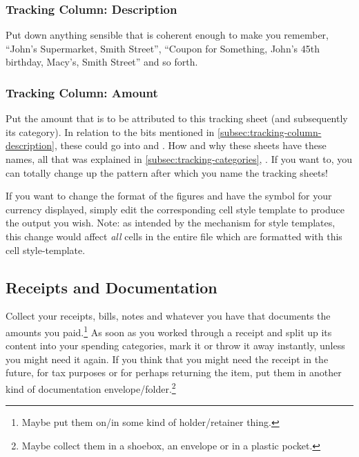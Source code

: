 \subsubsection{Tracking Column: Description}
\label{subsec:tracking-column-description}

Put down anything sensible that is coherent enough to make you remember, \eg ``John's Supermarket, Smith Street'', ``Coupon for Something, John's 45th birthday, Macy's, Smith Street'' and so forth.

\subsubsection{Tracking Column: Amount}
\label{subsec:tracking-column-amount}

Put the amount that is to be attributed to this tracking sheet (and subsequently its category).
In relation to the bits mentioned in \autoref{subsec:tracking-column-description}, these could go into  and .
How and why these sheets have these names, all that was explained in \autoref{subsec:tracking-categories}, .
If you want to, you can totally change up the pattern after which you name the tracking sheets!

If you want to change the format of the figures and have the symbol for your currency displayed, simply edit the corresponding cell style template to produce the output you wish.
Note: as intended by the mechanism for style templates, this change would affect \emph{all} cells in the entire file which are formatted with this cell style-template.

\subsection{Receipts and Documentation}
\label{subsec:tracking-receipts}

Collect your receipts, bills, notes and whatever you have that documents the amounts you paid.\footnote{Maybe put them on/in some kind of holder/retainer thing.}
As soon as you worked through a receipt and split up its content into your spending categories, mark it or throw it away instantly, unless you might need it again.
If you think that you might need the receipt in the future, \eg for tax purposes or for perhaps returning the item, put them in another kind of documentation envelope/folder.\footnote{Maybe collect them in a shoebox, an envelope or in a plastic pocket.}

